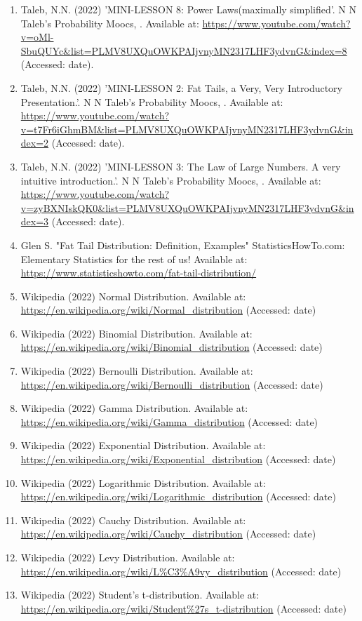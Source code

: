 \documentclass[14pt, a4paper]{article}
\theoremstyle{definition}
\begin{document}
\begin{enumerate}
    \item Taleb, N.N. (2022) 'MINI-LESSON 8: Power Laws(maximally simplified'. N N Taleb’s Probability Moocs, . Available at: \url{https://www.youtube.com/watch?v=oMl-SbuQUYc&list=PLMV8UXQuOWKPAIjvnyMN2317LHF3ydvnG&index=8} (Accessed: date).
    \item Taleb, N.N. (2022) 'MINI-LESSON 2: Fat Tails, a Very, Very Introductory Presentation.'. N N Taleb’s Probability Moocs, . Available at: \url{https://www.youtube.com/watch?v=t7Fr6iGhmBM&list=PLMV8UXQuOWKPAIjvnyMN2317LHF3ydvnG&index=2} (Accessed: date).
    \item Taleb, N.N. (2022) 'MINI-LESSON 3: The Law of Large Numbers. A very intuitive introduction.'. N N Taleb’s Probability Moocs, . Available at: \url{https://www.youtube.com/watch?v=zyBXNIskQK0&list=PLMV8UXQuOWKPAIjvnyMN2317LHF3ydvnG&index=3} (Accessed: date).
    \item Glen S. "Fat Tail Distribution: Definition, Examples" StatisticsHowTo.com: Elementary Statistics for the rest of us! Available at: \url{https://www.statisticshowto.com/fat-tail-distribution/}
    \item Wikipedia (2022) Normal Distribution. Available at: \url{https://en.wikipedia.org/wiki/Normal_distribution} (Accessed: date)
    \item Wikipedia (2022) Binomial Distribution. Available at: \url{https://en.wikipedia.org/wiki/Binomial_distribution} (Accessed: date)
    \item Wikipedia (2022) Bernoulli Distribution. Available at: \url{https://en.wikipedia.org/wiki/Bernoulli_distribution} (Accessed: date)
    \item Wikipedia (2022) Gamma Distribution. Available at: \url{https://en.wikipedia.org/wiki/Gamma_distribution} (Accessed: date)
    \item Wikipedia (2022) Exponential Distribution. Available at: \url{https://en.wikipedia.org/wiki/Exponential_distribution} (Accessed: date)
    \item Wikipedia (2022) Logarithmic Distribution. Available at: \url{https://en.wikipedia.org/wiki/Logarithmic_distribution} (Accessed: date)
    \item Wikipedia (2022) Cauchy Distribution. Available at: \url{https://en.wikipedia.org/wiki/Cauchy_distribution} (Accessed: date)
    \item Wikipedia (2022) Levy Distribution. Available at: \url{https://en.wikipedia.org/wiki/L%C3%A9vy_distribution} (Accessed: date)
    \item Wikipedia (2022) Student's t-distribution. Available at: \url{https://en.wikipedia.org/wiki/Student%27s_t-distribution} (Accessed: date)

\end{enumerate}
\end{document}
